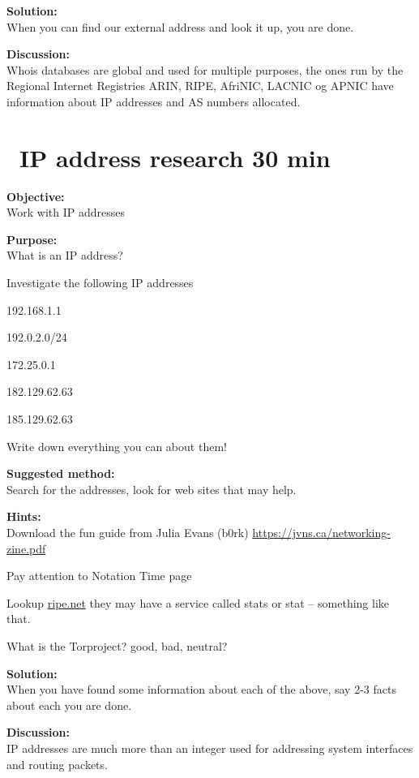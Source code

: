 \documentclass[a4paper,11pt,notitlepage]{report}
\begin{document}
{\bf Solution:}\\
When you can find our external address and look it up, you are done.

{\bf Discussion:}\\
Whois databases are global and used for multiple purposes, the ones run by the Regional Internet Registries ARIN, RIPE, AfriNIC, LACNIC og APNIC have information about IP addresses and AS numbers allocated.


\chapter{\faExclamationTriangle\ IP address research 30 min}
\label{ex:ip-address-research}

{\bf Objective:}\\
Work with IP addresses

{\bf Purpose:}\\
What is an IP address?

Investigate the following IP addresses
\begin{list2}
\item 192.168.1.1
\item 192.0.2.0/24
\item 172.25.0.1
\item 182.129.62.63
\item 185.129.62.63
\end{list2}

Write down everything you can about them!

{\bf Suggested method:}\\
Search for the addresses, look for web sites that may help.

{\bf Hints:}\\
Download the fun guide from Julia Evans (b0rk) \url{https://jvns.ca/networking-zine.pdf}

Pay attention to Notation Time page

Lookup \url{ripe.net} they may have a service called stats or stat -- something like that.

What is the Torproject? good, bad, neutral?

{\bf Solution:}\\
When you have found some information about each of the above, say 2-3 facts about each you are done.

{\bf Discussion:}\\
IP addresses are much more than an integer used for addressing system interfaces and routing packets.
\end{document}
